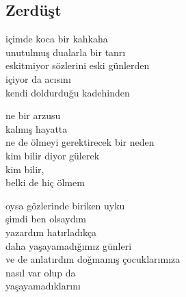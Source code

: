 \subsection{Zerdüşt}

içimde koca bir kahkaha \\
unutulmuş dualarla bir tanrı \\
eskitmiyor sözlerini eski günlerden \\
içiyor da acısını \\
kendi doldurduğu kadehinden

\noindent\newline
ne bir arzusu \\
kalmış hayatta \\
ne de ölmeyi gerektirecek bir neden \\
kim bilir diyor gülerek \\
kim bilir, \\
belki de hiç ölmem

\noindent\newline
oysa gözlerinde biriken uyku \\
şimdi ben olsaydım \\
yazardım hatırladıkça \\
daha yaşayamadığımız günleri \\
ve de anlatırdım doğmamış çocuklarımıza \\
nasıl var olup da \\
yaşayamadıklarını